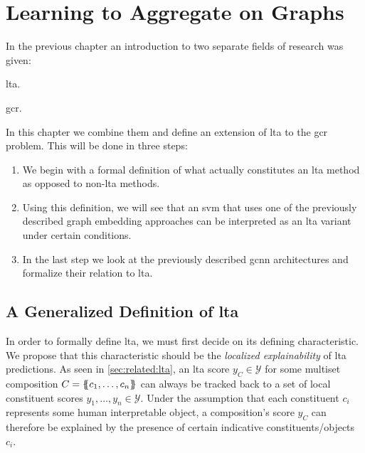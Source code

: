 \chapter{Learning to Aggregate on Graphs}%
\label{sec:ltag}

In the previous chapter an introduction to two separate fields of research was given:
\begin{enumerate*}[label={\circled{\small\arabic*}}]
	\item \Acf{lta}.
	\item \Acf{gcr}.
\end{enumerate*}
In this chapter we combine them and define an extension of \ac{lta} to the \ac{gcr} problem.
This will be done in three steps:
\begin{enumerate}
	\item We begin with a formal definition of what actually constitutes an \ac{lta} method as opposed to non-\acs{lta} methods.
	\item Using this definition, we will see that an \ac{svm} that uses one of the previously described graph embedding approaches can be interpreted as an \ac{lta} variant under certain conditions.
	\item In the last step we look at the previously described \ac{gcnn} architectures and formalize their relation to \ac{lta}.
\end{enumerate}

\section{A Generalized Definition of \acs*{lta}}%
\label{sec:ltag:definition}

In order to formally define \ac{lta}, we must first decide on its defining characteristic.
We propose that this characteristic should be the \textit{localized explainability} of \ac{lta} predictions.
As seen in \cref{sec:related:lta}, an \ac{lta} score $y_{C} \in \mathcal{Y}$ for some multiset composition $C = \ldblbrace c_1, \dots, c_n \rdblbrace$ can always be tracked back to a set of local constituent scores $y_1, \dots, y_n \in \mathcal{Y}$.
Under the assumption that each constituent $c_i$ represents some human interpretable object, a composition's score $y_{C}$ can therefore be explained by the presence of certain indicative constituents/objects $c_i$.

